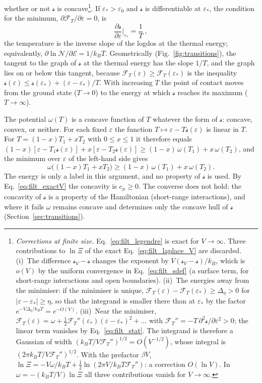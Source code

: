 \documentclass[10pt,a4paper]{article}
\theoremstyle{plain}
\newcommand{\cN}{\mathcal{N}}   %
\newcommand{\lndos}{{logdos}}  %
\newcommand{\enrg}{\mathcal{E}}  %
\newcommand{\Fen}[1][T]{\mathscr{F}_{#1}}  %
\newcommand{\lds}{\mathscr{s}}  %
\begin{document}
whether or not $\lds$ is concave\footnote{\label{fn:finite}\emph{Corrections
at finite size.} Eq.~\eqref{eq:filt_legendre} is exact for $V\to\infty$.
Three contributions to $\ln\Xi$ of the exact Eq.~\eqref{eq:filt_laplace_V}
are discarded.
(i)~The difference $\lds_V-\lds$ changes the exponent by
$V(\lds_V-\lds)/k_B$, which is $o(V)$ by the uniform convergence in
Eq.~\eqref{eq:filt_sdef} (a surface term, for short-range interactions and
open boundaries).
(ii)~The energies away from the minimiser: if the minimiser is unique,
$\Fen(\varepsilon)-\Fen(\varepsilon_*)\ge\Delta_\eta>0$ for
$|\varepsilon-\varepsilon_*|\ge\eta$, so that the integrand is smaller there
than at $\varepsilon_*$ by the factor $e^{-V\Delta_\eta/k_BT}=e^{-O(V)}$.
(iii)~Near the minimiser,
$\Fen(\varepsilon)=\omega+\tfrac12\Fen''(\varepsilon_*)(\varepsilon-\varepsilon_*)^{2}+\dots$
with $\Fen''=-T\,\partial^{2}\lds/\partial\varepsilon^{2}>0$; the linear term
vanishes by Eq.~\eqref{eq:filt_stat}. The integrand is therefore a Gaussian
of width $(k_BT/V\Fen'')^{1/2}=O(V^{-1/2})$, whose integral is
$(2\pi k_BT/V\Fen'')^{1/2}$. With the prefactor $\beta V$,
$\ln\Xi=-V\omega/k_BT+\tfrac12\ln(2\pi V/k_BT\Fen'')$: a correction
$O(\ln V)$. In $\omega=-(k_BT/V)\ln\Xi$ all three contributions vanish for
$V\to\infty$.}. If $\varepsilon_*>\varepsilon_0$ and $\lds$ is
differentiable at $\varepsilon_*$, the condition for the minimum,
$\partial\Fen/\partial\varepsilon=0$, is
\begin{equation}\label{eq:filt_stat}
  \frac{\partial \lds}{\partial\varepsilon}\bigg|_{\varepsilon_*}=\frac1T ~,
\end{equation}
the temperature is the inverse slope of the \lndos{} at the thermal energy;
equivalently, $\partial\ln\cN/\partial\enrg=1/k_BT$.
Geometrically (Fig.~\ref{fig:transitions}), the tangent to the graph of
$\lds$ at the thermal energy has the slope $1/T$, and the graph lies on or
below this tangent, because
$\Fen(\varepsilon)\ge\Fen(\varepsilon_*)$ is the inequality
$\lds(\varepsilon)\le\lds(\varepsilon_*)+(\varepsilon-\varepsilon_*)/T$. With
increasing $T$ the point of contact moves from the ground state ($T\to0$) to
the energy at which $\lds$ reaches its maximum ($T\to\infty$).

The potential $\omega(T)$ is a concave function of $T$ whatever the form of
$\lds$: concave, convex, or neither. For each fixed $\varepsilon$ the
function $T\mapsto\varepsilon-T\lds(\varepsilon)$ is linear in $T$. For
$T=(1-x)T_1+xT_2$ with $0\le x\le1$ it therefore equals
$(1-x)[\varepsilon-T_1\lds(\varepsilon)]+x[\varepsilon-T_2\lds(\varepsilon)]
\ge(1-x)\,\omega(T_1)+x\,\omega(T_2)$, and the minimum over $\varepsilon$ of
the left-hand side gives
\begin{equation}\label{eq:filt_wconcave}
  \omega\big((1-x)T_1+xT_2\big)\ge(1-x)\,\omega(T_1)+x\,\omega(T_2) .
\end{equation}
The energy is only a label in this argument, and no property of $\lds$ is
used. By Eq.~\eqref{eq:filt_exactV} the concavity is $c_\mu\ge0$. The
converse does not hold: the concavity of $\lds$ is a property of the
Hamiltonian (short-range interactions), and where it fails $\omega$ remains
concave and determines only the concave hull of $\lds$
(Section~\ref{sec:transitions}).
\end{document}
